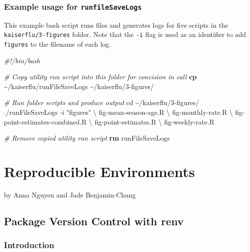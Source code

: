 \documentclass[
]{book}
\newenvironment{Shaded}{\begin{snugshade}}{\end{snugshade}}
\newcommand{\AttributeTok}[1]{\textcolor[rgb]{0.13,0.29,0.53}{#1}}
\newcommand{\BuiltInTok}[1]{#1}
\newcommand{\CommentTok}[1]{\textcolor[rgb]{0.56,0.35,0.01}{\textit{#1}}}
\newcommand{\DataTypeTok}[1]{\textcolor[rgb]{0.13,0.29,0.53}{#1}}
\newcommand{\ExtensionTok}[1]{#1}
\newcommand{\FunctionTok}[1]{\textcolor[rgb]{0.13,0.29,0.53}{\textbf{#1}}}
\newcommand{\NormalTok}[1]{#1}
\newcommand{\StringTok}[1]{\textcolor[rgb]{0.31,0.60,0.02}{#1}}
\begin{document}
\subsection{\texorpdfstring{Example usage for \texttt{runfileSaveLogs}}{Example usage for runfileSaveLogs}}\label{example-usage-for-runfilesavelogs}

This example bash script runs files and generates logs for five scripts in the \texttt{kaiserflu/3-figures} folder. Note that the \texttt{-i} flag is used as an identifier to add \texttt{figures} to the filename of each log.

\begin{Shaded}
\begin{Highlighting}[]
\CommentTok{\#!/bin/bash}

\CommentTok{\# Copy utility run script into this folder for concision in call}
\FunctionTok{cp}\NormalTok{ \textasciitilde{}/kaiserflu/runFileSaveLogs \textasciitilde{}/kaiserflu/3{-}figures/}

\CommentTok{\# Run folder scripts and produce output}
\BuiltInTok{cd}\NormalTok{ \textasciitilde{}/kaiserflu/3{-}figures/}
\ExtensionTok{./runFileSaveLogs} \AttributeTok{{-}i} \StringTok{"figures"} \DataTypeTok{\textbackslash{}}
\NormalTok{fig{-}mean{-}season{-}age.R }\DataTypeTok{\textbackslash{}}
\NormalTok{fig{-}monthly{-}rate.R }\DataTypeTok{\textbackslash{}}
\NormalTok{fig{-}point{-}estimates{-}combined.R }\DataTypeTok{\textbackslash{}}
\NormalTok{fig{-}point{-}estimates.R }\DataTypeTok{\textbackslash{}}
\NormalTok{fig{-}weekly{-}rate.R}

\CommentTok{\# Remove copied utility run script}
\FunctionTok{rm}\NormalTok{ runFileSaveLogs}
\end{Highlighting}
\end{Shaded}

\chapter{Reproducible Environments}\label{reproducible-environments}

by Anna Nguyen and Jade Benjamin-Chung

\section{Package Version Control with renv}\label{package-version-control-with-renv}

\subsection{Introduction}\label{introduction}
\end{document}
